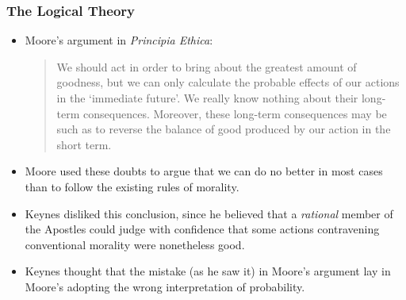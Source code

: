 \documentclass[usenames,dvipsnames, 10pt]{beamer}
\begin{document}
\begin{frame}
	\frametitle{The Logical Theory}
	\begin{itemize}
		\item Moore’s argument in \emph{Principia Ethica}:		
		
		\begin{quote}
			We should act in order to bring about the greatest amount
			of goodness, but we can only calculate the probable effects of our actions in the
			‘immediate future’. We really know nothing about their long-term consequences.
			Moreover, these long-term consequences may be such as to reverse the balance
			of good produced by our action in the short term. 
		\end{quote}

	\pause
	\item Moore used these doubts to argue that we can do no better in most cases than to follow the existing rules of morality.

	\pause
	\item Keynes disliked this conclusion, since he believed that a \emph{rational}
	member of the Apostles could judge with confidence that some actions
	contravening conventional morality were nonetheless good.
	
	\pause
	\item Keynes thought that the mistake (as he saw it) in Moore’s argument lay in Moore’s adopting the wrong
	interpretation of probability.
	\end{itemize}
\end{frame}

%		
\end{document}
